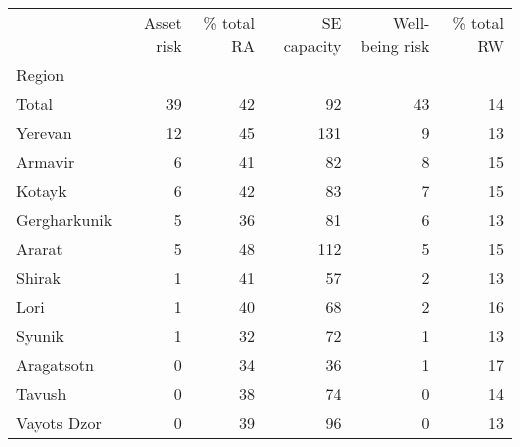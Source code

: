 \begin{tabular}{lrrrrr}
\toprule
{} &  Asset risk &  \% total RA &  SE capacity &  Well-being risk &  \% total RW \\
Region       &             &             &              &                  &             \\
\midrule
Total        &          39 &          42 &           92 &               43 &          14 \\
Yerevan      &          12 &          45 &          131 &                9 &          13 \\
Armavir      &           6 &          41 &           82 &                8 &          15 \\
Kotayk       &           6 &          42 &           83 &                7 &          15 \\
Gergharkunik &           5 &          36 &           81 &                6 &          13 \\
Ararat       &           5 &          48 &          112 &                5 &          15 \\
Shirak       &           1 &          41 &           57 &                2 &          13 \\
Lori         &           1 &          40 &           68 &                2 &          16 \\
Syunik       &           1 &          32 &           72 &                1 &          13 \\
Aragatsotn   &           0 &          34 &           36 &                1 &          17 \\
Tavush       &           0 &          38 &           74 &                0 &          14 \\
Vayots Dzor  &           0 &          39 &           96 &                0 &          13 \\
\bottomrule
\end{tabular}
